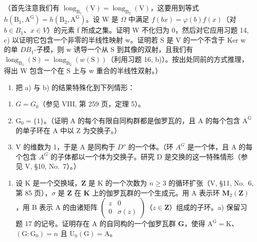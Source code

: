 （首先注意我们有 \(\operatorname{long}_{\mathrm{B}_{1}}(\mathrm{V}) = \operatorname{long}_{\mathrm{B}_{2}}(\mathrm{V})\)，这要用到等式 \(h(\mathrm{B}_{1}, \mathrm{A}^{\mathrm{G}}) = h(\mathrm{B}_{2}, \mathrm{A}^{\mathrm{G}})\)。设 W 是 \(\Omega\) 中满足 \(f(bx) = \varphi(b)f(x)\)（对 \(b \in B_{1}\)、\(x \in V\)）的元素 f 所成之集。证明 W 不化归为 0，然后对它应用习题 14, c) 以证明它包含一个非零的半线性映射 w。证明若 S 是 V 的一个不含于 Ker w 的单 \(DB_{1}\)-子模，则 w 诱导一个从 S 到其像的双射，且我们有 \(\operatorname{long}_{\mathrm{B}_{1}}(\mathrm{S}) = \operatorname{long}_{\mathrm{B}_{2}}(w(\mathrm{S}))\)（利用习题 16, b)）。按出处同前的方式推理，得出 W 包含一个在 S 上与 w 重合的半线性双射。）

\begin{enumerate}
\def\labelenumi{\alph{enumi})}
\setcounter{enumi}{2}
\tightlist
\item
  把 a) 与 b) 的结果特殊化到下列情形：
\end{enumerate}

\begin{enumerate}
\def\labelenumi{(\roman{enumi})}
\item
  \(G = G_{0}\)（参见 VIII, 第 259 页，定理 5）。
\item
  \(\mathrm{G}_0 = \{1\}\)。（证明 A 的每个有限自同构群都是伽罗瓦的，且 A 的每个包含 \(\mathrm{A}^{\mathrm{G}}\) 的单子环在 A 中以 Z 为交换子。）
\item
  V 的维数为 1，于是 A 是同构于 \(D^{o}\) 的一个体。（环 \(A^{G}\) 是一个体，且 A 的每个包含 \(A^{G}\) 的子体都以一个体为交换子。研究 D 是交换的这一特殊情形（参见 V, §10, No.~7）。）
\end{enumerate}

\begin{enumerate}
\def\labelenumi{\arabic{enumi})}
\setcounter{enumi}{17}
\tightlist
\item
  设 \(\mathrm{K}\) 是一个交换域，\(\mathbf{Z}\) 是 \(\mathrm{K}\) 的一个次数为 \(n \geqslant 3\) 的循环扩张（V, §11, No.~6, 第 85 页），\(\sigma\) 是 \(\mathbf{Z}\) 在 \(\mathbf{K}\) 上的伽罗瓦群的一个生成元。用 A 表示环 \(\mathbf{M}_2(\mathbf{Z})\)，用 B 表示 A 的由诸矩阵 \(\left( \begin{array}{cc}z & 0\\ 0 & \sigma (z) \end{array} \right)\)（\(z\in \mathbf{Z}\)）组成的子环。a) 保留习题 17 的记号。证明存在 A 的自同构的一个伽罗瓦群 \(\mathbf{G}\)，使得 \(\mathrm{A}^{\mathrm{G}} = \mathrm{K}\)、\((\mathrm{G}:\mathrm{G}_0) = n\) 且 \(\mathrm{U}_0(\mathrm{G}) = \mathrm{A}\)。
\end{enumerate}

